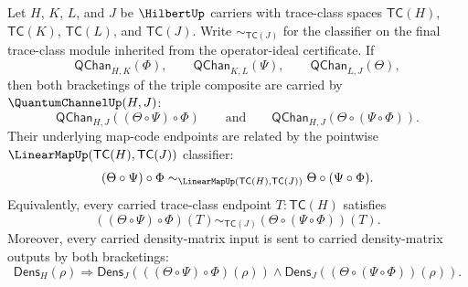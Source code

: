 \begin{theorem}
\label{thm:quantumchannel-composition-associativity-law}
Let $H$, $K$, $L$, and $J$ be $\HilbertUp$ carriers with trace-class spaces $\mathsf{TC}(H)$, $\mathsf{TC}(K)$, $\mathsf{TC}(L)$, and $\mathsf{TC}(J)$. Write $\sim_{\mathsf{TC}(J)}$ for the classifier on the final trace-class module inherited from the operator-ideal certificate. If
$$
\mathsf{QChan}_{H,K}(\Phi),
\qquad
\mathsf{QChan}_{K,L}(\Psi),
\qquad
\mathsf{QChan}_{L,J}(\Theta),
$$
then both bracketings of the triple composite are carried by $\QuantumChannelUp(H,J)$:
$$
\mathsf{QChan}_{H,J}((\Theta\circ\Psi)\circ\Phi)
\qquad\text{and}\qquad
\mathsf{QChan}_{H,J}(\Theta\circ(\Psi\circ\Phi)).
$$
Their underlying map-code endpoints are related by the pointwise $\LinearMapUp(\mathsf{TC}(H),\mathsf{TC}(J))$ classifier:
$$
(\Theta\circ\Psi)\circ\Phi
\sim_{\LinearMapUp(\mathsf{TC}(H),\mathsf{TC}(J))}
\Theta\circ(\Psi\circ\Phi).
$$
Equivalently, every carried trace-class endpoint $T:\mathsf{TC}(H)$ satisfies
$$
((\Theta\circ\Psi)\circ\Phi)(T)
\sim_{\mathsf{TC}(J)}
(\Theta\circ(\Psi\circ\Phi))(T).
$$
Moreover, every carried density-matrix input is sent to carried density-matrix outputs by both bracketings:
$$
\mathsf{Dens}_H(\rho)
\Longrightarrow
\mathsf{Dens}_J(((\Theta\circ\Psi)\circ\Phi)(\rho))
\land
\mathsf{Dens}_J((\Theta\circ(\Psi\circ\Phi))(\rho)).
$$
\end{theorem}

